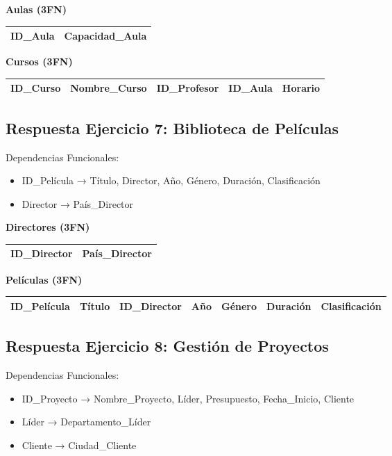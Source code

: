 \documentclass[12pt]{article}
\begin{document}
\textbf{Aulas (3FN)}
\begin{center}
\begin{tabular}{|l|l|}
\hline
ID\_Aula & Capacidad\_Aula \\
\hline
\end{tabular}
\end{center}

\textbf{Cursos (3FN)}
\begin{center}
\begin{tabular}{|l|l|l|l|l|}
\hline
ID\_Curso & Nombre\_Curso & ID\_Profesor & ID\_Aula & Horario \\
\hline
\end{tabular}
\end{center}

\subsection{Respuesta Ejercicio 7: Biblioteca de Películas}

Dependencias Funcionales:
\begin{itemize}
    \item ID\_Película → Título, Director, Año, Género, Duración, Clasificación
    \item Director → País\_Director
\end{itemize}

\textbf{Directores (3FN)}
\begin{center}
\begin{tabular}{|l|l|}
\hline
ID\_Director & País\_Director \\
\hline
\end{tabular}
\end{center}

\textbf{Películas (3FN)}
\begin{center}
\begin{tabular}{|l|l|l|l|l|l|l|}
\hline
ID\_Película & Título & ID\_Director & Año & Género & Duración & Clasificación \\
\hline
\end{tabular}
\end{center}

\subsection{Respuesta Ejercicio 8: Gestión de Proyectos}

Dependencias Funcionales:
\begin{itemize}
    \item ID\_Proyecto → Nombre\_Proyecto, Líder, Presupuesto, Fecha\_Inicio, Cliente
    \item Líder → Departamento\_Líder
    \item Cliente → Ciudad\_Cliente
\end{itemize}
\end{document}
